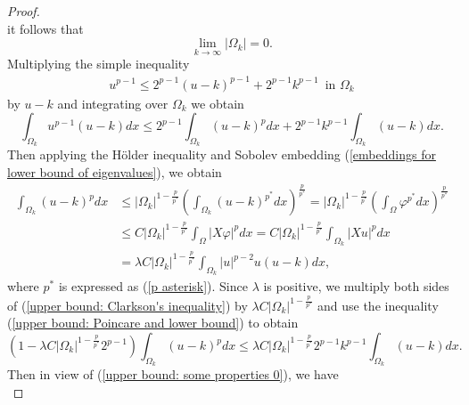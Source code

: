 \documentclass[a4paper,12pt,reqno]{amsart}
\renewcommand\eqref[1]{(\ref{#1})} %
\numberwithin{equation}{section}
\theoremstyle{plain}
\theoremstyle{definition}
\begin{document}
\begin{proof}
\begin{equation}
\end{equation}
it follows that
\begin{equation}\label{upper bound: some properties}
 \lim_{k\to \infty}\left|\Omega_{k}\right|=0.
\end{equation}
Multiplying the simple inequality
\begin{equation}
\begin{aligned}
u^{p-1}   \leq 2^{p-1}(u-k)^{p-1}+2^{p-1} k^{p-1} \enspace \text{in } \Omega_{k}
\end{aligned}
\end{equation}
by $u-k$ and integrating over $\Omega_{k}$ we obtain
\begin{equation}\label{upper bound: Clarkson's inequality}
\int_{\Omega_{k}} u^{p-1}(u-k) d x \leq 2^{p-1} \int_{\Omega_{k}}(u-k)^{p} d x+2^{p-1} k^{p-1} \int_{\Omega_{k}}(u-k) d x.
\end{equation}
Then applying the H\"older inequality and  Sobolev embedding \eqref{embeddings for lower bound of eigenvalues}, we obtain
\begin{equation}\label{upper bound: Poincare and lower bound}
\begin{aligned}
\int_{\Omega_{k}}(u-k)^{p} d x &\leq|\Omega_{k}|^{1-\frac{p}{p^{*}}}\left(\int_{\Omega_{k}}(u-k)^{p^{*}}dx\right)^{\frac{p}{p^{*}}}= |\Omega_{k}|^{1-\frac{p}{p^{*}}}\left(\int_{\Omega}\varphi^{p^{*}}dx\right)^{\frac{p}{p^{*}}}\\
&\leq C \left|\Omega_{k}\right|^{1-\frac{p}{p^{*}}} \int_{\Omega}|X \varphi|^{p} d x=C\left|\Omega_{k}\right|^{1-\frac{p}{p^{*}}} \int_{\Omega_{k}}|X u|^{p} d x\\
&=\lambda  C \left|\Omega_{k}\right|^{1-\frac{p}{p^{*}}}\int_{\Omega_{k}}|u|^{p-2}u (u-k)dx,
\end{aligned}
\end{equation}
where $p^{*}$ is expressed as \eqref{p asterisk}. Since $\lambda$ is positive, we multiply both sides of \eqref{upper bound: Clarkson's inequality} by $\lambda  C \left|\Omega_{k}\right|^{1-\frac{p}{p^{*}}}$ and use the inequality \eqref{upper bound: Poincare and lower bound} to obtain
\begin{equation*}
\left(1-\lambda C \left|\Omega_{k}\right|^{1-\frac{p}{p^{*}}}2^{p-1}\right) \int_{\Omega_{k}}(u-k)^{p} d x \leq \lambda C\left|\Omega_{k}\right|^{1-\frac{p}{p^{*}}}2^{p-1}k^{p-1}  \int_{\Omega_{k}}(u-k) d x .
\end{equation*}
Then in view of \eqref{upper bound: some properties 0}, we have
\begin{equation*}

\end{equation*}
\end{proof}
\end{document}
